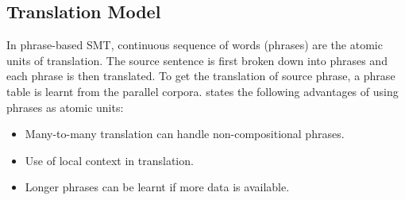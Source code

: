 
\subsection{Translation Model}\label{intro-tm}
In phrase-based SMT, continuous sequence of words (phrases) are the atomic units of translation. The source sentence is first broken down into phrases and each phrase is then translated. To get the translation of source phrase, a phrase table is learnt from the parallel corpora. \cite{Koehn2009} states the following advantages of using phrases as atomic units:
\begin{itemize}
	\item Many-to-many translation can handle non-compositional phrases.
	\item Use of local context in translation.
	\item Longer phrases can be learnt if more data is available.
\end{itemize}

